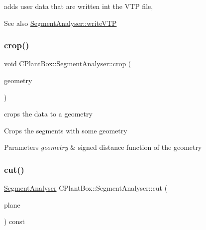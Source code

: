 adds user data that are written int the V\+TP file, 

\begin{DoxySeeAlso}{See also}
\hyperlink{classCPlantBox_1_1SegmentAnalyser_a491635f641d9f9ce71bf3efee352ff66}{Segment\+Analyser\+::write\+V\+TP} 
\end{DoxySeeAlso}
\mbox{\label{classCPlantBox_1_1SegmentAnalyser_ad36ee62a998e34484b96b2c12ec92fca}} 
\subsubsection{\texorpdfstring{crop()}{crop()}}
{\footnotesize\ttfamily void C\+Plant\+Box\+::\+Segment\+Analyser\+::crop (\begin{DoxyParamCaption}\item[{\hyperlink{classCPlantBox_1_1SignedDistanceFunction}{Signed\+Distance\+Function} $\ast$}]{geometry }\end{DoxyParamCaption})}



crops the data to a geometry 

Crops the segments with some geometry


\begin{DoxyParams}{Parameters}
{\em geometry} & signed distance function of the geometry \\
\hline
\end{DoxyParams}
\mbox{\label{classCPlantBox_1_1SegmentAnalyser_a777f3abc5ed7a351ca228e1bf7da0957}} 
\subsubsection{\texorpdfstring{cut()}{cut()}\hspace{0.1cm}{\footnotesize\ttfamily [1/2]}}
{\footnotesize\ttfamily \hyperlink{classCPlantBox_1_1SegmentAnalyser}{Segment\+Analyser} C\+Plant\+Box\+::\+Segment\+Analyser\+::cut (\begin{DoxyParamCaption}\item[{const \hyperlink{classCPlantBox_1_1SDF__HalfPlane}{S\+D\+F\+\_\+\+Half\+Plane} \&}]{plane }\end{DoxyParamCaption}) const}



